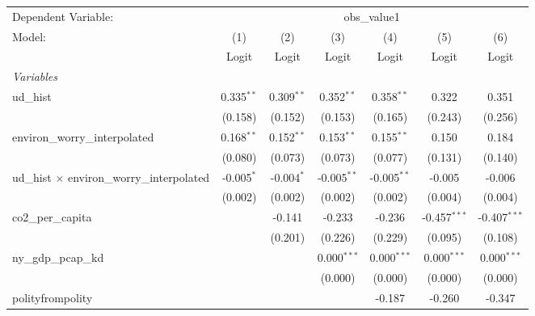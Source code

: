 
\begingroup
\centering
\begin{tabular}{lcccccc}
   \toprule
   Dependent Variable: & \multicolumn{6}{c}{obs\_value1}\\
   Model:                                             & (1)          & (2)          & (3)           & (4)           & (5)            & (6)\\  
                                                      &  Logit       & Logit        & Logit         & Logit         & Logit          & Logit\\  
   \midrule
   \emph{Variables}\\
   ud\_hist                                           & 0.335$^{**}$ & 0.309$^{**}$ & 0.352$^{**}$  & 0.358$^{**}$  & 0.322          & 0.351\\   
                                                      & (0.158)      & (0.152)      & (0.153)       & (0.165)       & (0.243)        & (0.256)\\   
   environ\_worry\_interpolated                       & 0.168$^{**}$ & 0.152$^{**}$ & 0.153$^{**}$  & 0.155$^{**}$  & 0.150          & 0.184\\   
                                                      & (0.080)      & (0.073)      & (0.073)       & (0.077)       & (0.131)        & (0.140)\\   
   ud\_hist $\times$ environ\_worry\_interpolated     & -0.005$^{*}$ & -0.004$^{*}$ & -0.005$^{**}$ & -0.005$^{**}$ & -0.005         & -0.006\\   
                                                      & (0.002)      & (0.002)      & (0.002)       & (0.002)       & (0.004)        & (0.004)\\   
   co2\_per\_capita                                   &              & -0.141       & -0.233        & -0.236        & -0.457$^{***}$ & -0.407$^{***}$\\   
                                                      &              & (0.201)      & (0.226)       & (0.229)       & (0.095)        & (0.108)\\   
   ny\_gdp\_pcap\_kd                                  &              &              & 0.000$^{***}$ & 0.000$^{***}$ & 0.000$^{***}$  & 0.000$^{***}$\\   
                                                      &              &              & (0.000)       & (0.000)       & (0.000)        & (0.000)\\   
   polityfrompolity                                   &              &              &               & -0.187        & -0.260         & -0.347\\   

\end{tabular}
